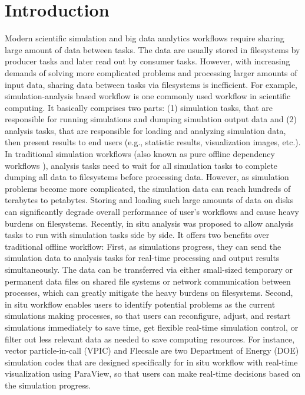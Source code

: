 \section{Introduction}
Modern scientific simulation and big data analytics workflows require sharing large amount of data between tasks. The data are usually stored in filesystems by producer tasks and later read out by consumer tasks. However, with increasing demands of solving more complicated problems and processing larger amounts of input data, sharing data between tasks via filesystems is inefficient. For example, simulation-analysis based workflow is one commonly used workflow in scientific computing. It basically comprises two parts: (1) simulation tasks, that are responsible for running simulations and dumping simulation output data and (2) analysis tasks, that are responsible for loading and analyzing simulation data, then present results to end users (e.g., statistic results, visualization images, etc.). In traditional simulation workflows (also known as pure offline dependency workflows \cite{sewell2015large}), analysis tasks need to wait for all simulation tasks to complete dumping all data to filesystems before processing data. However, as simulation problems become more complicated, the simulation data can reach hundreds of terabytes to petabytes. Storing and loading such large amounts of data on disks can significantly degrade overall performance of user's workflows and cause heavy burdens on filesystems. Recently, in situ analysis \cite{sewell2015large} was proposed to allow analysis tasks to run with simulation tasks side by side. It offers two benefits over traditional offline workflow: First, as simulations progress, they can send the simulation data to analysis tasks for real-time processing and output results simultaneously. The data can be transferred via either small-sized temporary or permanent data files on shared file systems or network communication between processes, which can greatly mitigate the heavy burdens on filesystems. Second, in situ workflow enables users to identify potential problems as the current simulations making processes, so that users can reconfigure, adjust, and restart simulations immediately to save time, get flexible real-time simulation control, or filter out less relevant data as needed to save computing resources. For instance, vector particle-in-call (VPIC) \cite{bowers20080, bowers2008ultrahigh, bowers2009advances} and Flecsale \cite{flecsale} are two Department of Energy (DOE) simulation codes that are designed specifically for in situ workflow with real-time visualization using ParaView, so that users can make real-time decisions based on the simulation progress.

